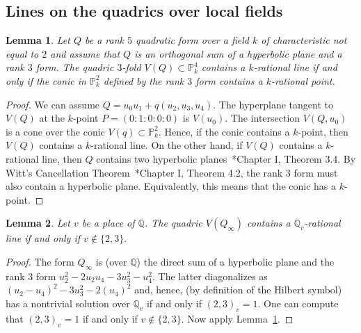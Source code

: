 \documentclass[12pt, reqno]{amsart}
\newtheorem{lemma}{Lemma}
\theoremstyle{definition}
\newcommand{\PP}{{\mathbb P}}
\newcommand{\Q}{{\mathbb Q}}
\begin{document}
\subsection{Lines on the quadrics over local fields}


\begin{lemma}\label{lem:lines}
	Let $Q$ be a rank $5$ quadratic form over a field $k$ of characteristic not equal to $2$ and assume that $Q$ is an orthogonal sum of a hyperbolic plane and a rank $3$ form. The quadric $3$-fold $V(Q) \subset \PP^4_k$ contains a $k$-rational line if and only if the conic in $\PP^2_k$ defined by the rank $3$ form contains a $k$-rational point.
\end{lemma}

\begin{proof}
	We can assume $Q = u_0u_1 + q(u_2,u_3,u_4)$. The hyperplane tangent to $V(Q)$ at the $k$-point $P = (0:1:0:0:0)$ is $V(u_0)$. The intersection $V(Q,u_0)$ is a cone over the conic $V(q) \subset \PP^2_k$. Hence, if the conic contains a $k$-point, then $V(Q)$ contains a $k$-rational line. On the other hand, if $V(Q)$ contains a $k$-rational line, then $Q$ contains two hyperbolic planes~\cite{Lam}*{Chapter I, Theorem 3.4}. By Witt's Cancellation Theorem~\cite{Lam}*{Chapter I, Theorem 4.2}, the rank $3$ form must also contain a hyperbolic plane. Equivalently, this means that the conic has a $k$-point.
\end{proof}

\begin{lemma}\label{lem:Ginfty}
   Let $v$ be a place of $\Q$. The quadric $V(Q_\infty)$ contains a $\Q_v$-rational line if and only if $v \not\in \{2,3\}.$
   \end{lemma}
   \begin{proof}
   	The form $Q_\infty$ is (over $\Q$) the direct sum of a hyperbolic plane and the rank $3$ form $u_2^2 - 2u_2u_4 - 3u_3^2 - u_4^2$. The latter diagonalizes as \((u_2 - u_4)^2 - 3u_3^2 - 2(u_4)^2\) and, hence, (by definition of the Hilbert symbol) has a nontrivial solution over \(\Q_v\) if and only if \((2,3)_v=1\). One can compute that \((2,3)_v = 1\) if and only if \(v\notin \{2,3\}\). Now apply Lemma~\ref{lem:lines}.	
   \end{proof}
\end{document}

